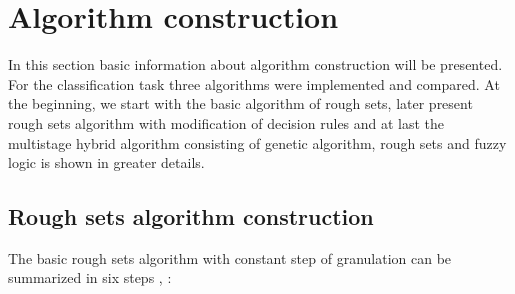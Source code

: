 \section{Algorithm construction}
\label{cha:Algorithm_construction}
In this section basic information about algorithm construction will be
presented. For the classification task three algorithms were implemented and
compared. At the beginning, we start with the basic algorithm of rough sets, later present rough sets
algorithm with modification of decision rules and at last the multistage hybrid 
algorithm consisting of genetic algorithm, rough sets and fuzzy logic is shown in 
greater details. 
\subsection{Rough sets algorithm construction}
\label{cha:Algorithm_construction_rough_set}
The basic rough sets algorithm with constant step of granulation
can be summarized in six steps \cite{bib34}, \cite{bib35}:
